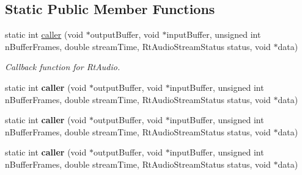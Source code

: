 \subsection*{Static Public Member Functions}
\begin{DoxyCompactItemize}
\item 
\hypertarget{classdispatch_a78e0b45ddb573d1b843ce02cd9092557}{static int \hyperlink{classdispatch_a78e0b45ddb573d1b843ce02cd9092557}{caller} (void $\ast$output\-Buffer, void $\ast$input\-Buffer, unsigned int n\-Buffer\-Frames, double stream\-Time, Rt\-Audio\-Stream\-Status status, void $\ast$data)}\label{classdispatch_a78e0b45ddb573d1b843ce02cd9092557}

\begin{DoxyCompactList}\small\item\em Callback function for Rt\-Audio. \end{DoxyCompactList}\item 
\hypertarget{classdispatch_a2bc93711c1aee895c430aece41ec026a}{static int {\bfseries caller} (void $\ast$output\-Buffer, void $\ast$input\-Buffer, unsigned int n\-Buffer\-Frames, double stream\-Time, Rt\-Audio\-Stream\-Status status, void $\ast$data)}\label{classdispatch_a2bc93711c1aee895c430aece41ec026a}

\item 
\hypertarget{classdispatch_a2bc93711c1aee895c430aece41ec026a}{static int {\bfseries caller} (void $\ast$output\-Buffer, void $\ast$input\-Buffer, unsigned int n\-Buffer\-Frames, double stream\-Time, Rt\-Audio\-Stream\-Status status, void $\ast$data)}\label{classdispatch_a2bc93711c1aee895c430aece41ec026a}

\item 
\hypertarget{classdispatch_a2bc93711c1aee895c430aece41ec026a}{static int {\bfseries caller} (void $\ast$output\-Buffer, void $\ast$input\-Buffer, unsigned int n\-Buffer\-Frames, double stream\-Time, Rt\-Audio\-Stream\-Status status, void $\ast$data)}\label{classdispatch_a2bc93711c1aee895c430aece41ec026a}

\end{DoxyCompactItemize}
